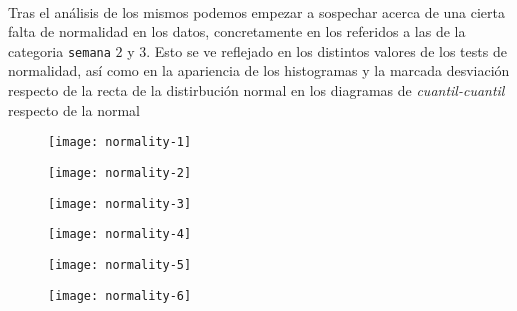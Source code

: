 \documentclass[11pt]{article}
\begin{document}
      \paragraph{}
      Tras el análisis de los mismos podemos empezar a sospechar acerca de una cierta falta de normalidad en los datos, concretamente en los referidos a las de la categoria \texttt{semana} $2$ y $3$. Esto se ve reflejado en los distintos valores de los tests de normalidad, así como en la apariencia de los histogramas y la marcada desviación respecto de la recta de la distirbución normal en los diagramas de \emph{cuantil-cuantil} respecto de la normal

      \begin{figure}[!h]
        \centering
        \begin{minipage}{.49\textwidth}
          \centering
          \texttt{[image: normality-1]}
          \caption{}
          \label{fig:normality-1}
        \end{minipage}
        \begin{minipage}{.49\textwidth}
          \centering
          \texttt{[image: normality-2]}
          \caption{}
          \label{fig:normality-2}
        \end{minipage}
        \begin{minipage}{.49\textwidth}
          \centering
          \texttt{[image: normality-3]}
          \caption{}
          \label{fig:normality-3}
        \end{minipage}
        \begin{minipage}{.49\textwidth}
          \centering
          \texttt{[image: normality-4]}
          \caption{}
          \label{fig:normality-4}
        \end{minipage}
        \begin{minipage}{.49\textwidth}
          \centering
          \texttt{[image: normality-5]}
          \caption{}
          \label{fig:normality-5}
        \end{minipage}
        \begin{minipage}{.49\textwidth}
          \centering
          \texttt{[image: normality-6]}
          \caption{}
          \label{fig:normality-6}
        \end{minipage}
      \end{figure}
\end{document}
